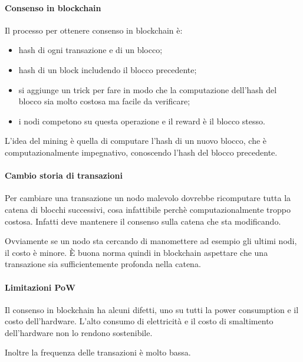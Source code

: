 \paragraph{Consenso in blockchain}
Il processo per ottenere consenso in blockchain è:
\begin{itemize}
    \item hash di ogni transazione e di un blocco;
    \item hash di un block includendo il blocco precedente;
    \item si aggiunge un trick per fare in modo che la computazione 
    dell'hash del blocco sia molto costosa ma facile da verificare;
    \item i nodi competono su questa operazione e il reward è 
    il blocco stesso.
\end{itemize} 
L'idea del mining è quella di computare l'hash di un nuovo blocco, 
che è computazionalmente impegnativo, conoscendo l'hash del 
blocco precedente.

\paragraph{Cambio storia di transazioni}
Per cambiare una transazione un nodo malevolo dovrebbe 
ricomputare tutta la catena di blocchi successivi, cosa infattibile perchè 
computazionalmente troppo costosa. Infatti deve mantenere 
il consenso sulla catena che sta modificando.

Ovviamente se un nodo sta cercando di manomettere ad esempio 
gli ultimi nodi, il costo è minore. È buona norma quindi in blockchain 
aspettare che una transazione sia sufficientemente profonda nella 
catena. 

\paragraph{Limitazioni PoW}
Il consenso in blockchain ha alcuni difetti, uno su tutti 
la power consumption e il costo dell'hardware. L'alto consumo 
di elettricità e il costo di smaltimento dell'hardware non lo rendono 
sostenibile.

Inoltre la frequenza delle transazioni è molto bassa.